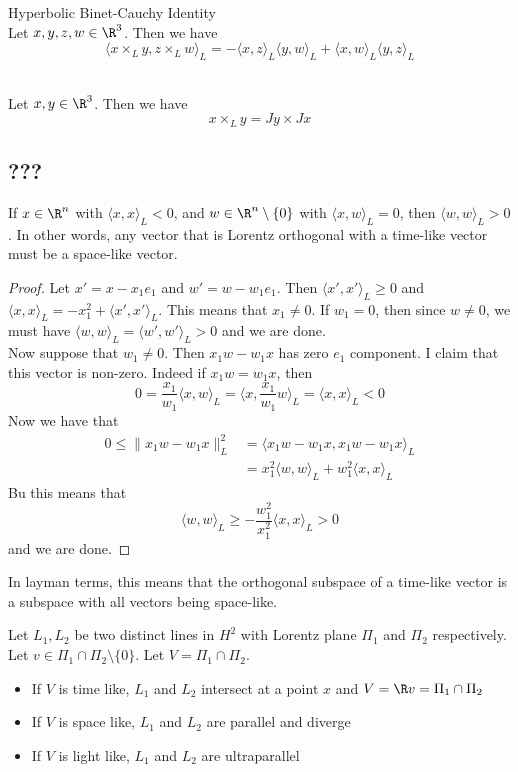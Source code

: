 \documentclass[a4paper]{article}
\begin{document}
\begin{lmm}{Hyperbolic Binet-Cauchy Identity}{}\\
Let $x,y,z,w\in\R^3$. Then we have $$\langle x\times_Ly,z\times_Lw\rangle_L=-\langle x,z\rangle_L\langle y,w\rangle_L+\langle x,w\rangle_L\langle y,z\rangle_L$$
\end{lmm}

\begin{lmm}{}{}\\
Let $x,y\in\R^3$. Then we have $$x\times_Ly=Jy\times Jx$$
\end{lmm}

\subsection{???}
\begin{lmm}{}{} If $x\in\R^n$ with $\langle x,x\rangle_L<0$, and $w\in\R^n\setminus\{0\}$ with $\langle x,w\rangle_L=0$, then $\langle w,w\rangle_L>0$. In other words, any vector that is Lorentz orthogonal with a time-like vector must be a space-like vector. 
\begin{proof}
Let $x'=x-x_1e_1$ and $w'=w-w_1e_1$. Then $\langle x',x'\rangle_L\geq 0$ and $\langle x,x\rangle_L=-x_1^2+\langle x',x'\rangle_L$. This means that $x_1\neq 0$. If $w_1=0$, then since $w\neq 0$, we must have $\langle w,w\rangle_L=\langle w',w'\rangle_L>0$ and we are done. \\
Now suppose that $w_1\neq 0$. Then $x_1w-w_1x$ has zero $e_1$ component. I claim that this vector is non-zero. Indeed if $x_1w=w_1x$, then $$0=\frac{x_1}{w_1}\langle x,w\rangle_L=\langle x,\frac{x_1}{w_1}w\rangle_L=\langle x,x\rangle_L<0$$ Now we have that 
\begin{align*}
0\leq\|x_1w-w_1x\|_L^2&=\langle x_1w-w_1x,x_1w-w_1x\rangle_L\\
&=x_1^2\langle w,w\rangle_L+w_1^2\langle x,x\rangle_L
\end{align*}
Bu this means that $$\langle w,w\rangle_L\geq-\frac{w_1^2}{x_1^2}\langle x,x\rangle_L>0$$ and we are done. 
\end{proof}
\end{lmm}

In layman terms, this means that the orthogonal subspace of a time-like vector is a subspace with all vectors being space-like. 

\begin{defn}{}{} Let $L_1,L_2$ be two distinct lines in $H^2$ with Lorentz plane $\Pi_1$ and $\Pi_2$ respectively. Let $v\in\Pi_1\cap\Pi_2\setminus\{0\}$. Let $V=\Pi_1\cap\Pi_2$. 
\begin{itemize}
\item If $V$ is time like, $L_1$ and $L_2$ intersect at a point $x$ and $V=\R v=\Pi_1\cap\Pi_2$
\item If $V$ is space like, $L_1$ and $L_2$ are parallel and diverge
\item If $V$ is light like, $L_1$ and $L_2$ are ultraparallel
\end{itemize}
\end{defn}
\end{document}
